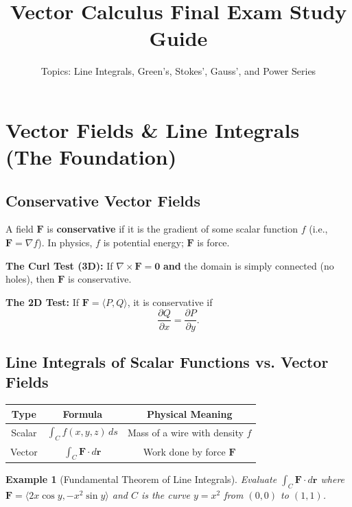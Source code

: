 \documentclass[11pt]{article}
\title{\textbf{Vector Calculus Final Exam Study Guide}}
\author{Topics: Line Integrals, Green's, Stokes', Gauss', and Power Series}
\date{}
\newtheorem{example}{Example}[section]
\newcommand{\F}{\mathbf{F}}
\newcommand{\curl}{\nabla \times}
\begin{document}
\maketitle
\tableofcontents
\newpage

\section{Vector Fields \& Line Integrals (The Foundation)}

\subsection{Conservative Vector Fields}
A field $\F$ is \textbf{conservative} if it is the gradient of some scalar function $f$ (i.e., $\F = \nabla f$). In physics, $f$ is potential energy; $\F$ is force.

\textbf{The Curl Test (3D):} If $\curl \F = \mathbf{0}$ \textbf{and} the domain is simply connected (no holes), then $\F$ is conservative.

\textbf{The 2D Test:} If $\F = \langle P, Q \rangle$, it is conservative if 
\[
\frac{\partial Q}{\partial x} = \frac{\partial P}{\partial y}.
\]

\subsection{Line Integrals of Scalar Functions vs. Vector Fields}

\begin{table}[h]
\centering
\begin{tabular}{|c|c|c|}
\hline
\textbf{Type} & \textbf{Formula} & \textbf{Physical Meaning} \\
\hline
Scalar & $\int_C f(x,y,z) \, ds$ & Mass of a wire with density $f$ \\
\hline
Vector & $\int_C \F \cdot d\mathbf{r}$ & Work done by force $\F$ \\
\hline
\end{tabular}
\end{table}

\begin{example}[Fundamental Theorem of Line Integrals]
Evaluate $\int_C \F \cdot d\mathbf{r}$ where $\F = \langle 2x \cos y, -x^2 \sin y \rangle$ and $C$ is the curve $y = x^2$ from $(0,0)$ to $(1,1)$.
\end{example}
\end{document}
